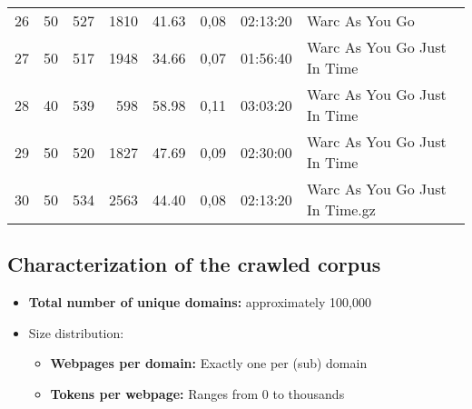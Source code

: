 \begin{table}[!ht]
\begin{tabular}{rrrrrrrl}
    26                    & 50                    & 527                          & 1810                   & 41.63             & 0,08                               & 02:13:20                                       & Warc As You Go                                           \\
    27                    & 50                    & 517                          & 1948                   & 34.66             & 0,07                               & 01:56:40                                       & Warc As You Go Just In Time                              \\
    28                    & 40                    & 539                          & 598                    & 58.98             & 0,11                               & 03:03:20                                       & Warc As You Go Just In Time                              \\
    29                    & 50                    & 520                          & 1827                   & 47.69             & 0,09                               & 02:30:00                                       & Warc As You Go Just In Time                              \\
    30                    & 50                    & 534                          & 2563                   & 44.40             & 0,08                               & 02:13:20                                       & Warc As You Go Just In Time.gz                           \\
  \end{tabular}
\end{table}

\subsection{Characterization of the crawled corpus}


\begin{itemize}
  \item \textbf{Total number of unique domains:} approximately 100,000
  \item Size distribution:
        \begin{itemize}
          \item \textbf{Webpages per domain:} Exactly one per (sub) domain
          \item \textbf{Tokens per webpage:} Ranges from 0 to thousands
        \end{itemize}
\end{itemize}

